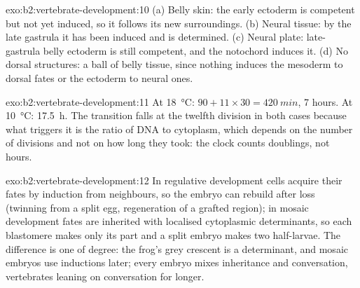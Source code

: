 \begin{solution}{exo:b2:vertebrate-development:10}
(a) Belly skin: the early ectoderm is competent but not yet induced,
so it follows its new surroundings. (b) Neural tissue: by the late
gastrula it has been induced and is determined. (c) Neural plate:
late-gastrula belly ectoderm is still competent, and the notochord
induces it. (d) No dorsal structures: a ball of belly tissue, since
nothing induces the mesoderm to dorsal fates or the ectoderm to
neural ones.
\end{solution}

\begin{solution}{exo:b2:vertebrate-development:11}
At \qty{18}{\celsius}: $90 + 11\times 30 = \qty{420}{min}$, 7 hours.
At \qty{10}{\celsius}: \qty{17.5}{h}. The transition falls at the
twelfth division in both cases because what triggers it is the
ratio of DNA to cytoplasm, which depends on the number of divisions
and not on how long they took: the clock counts doublings, not
hours.
\end{solution}

\begin{solution}{exo:b2:vertebrate-development:12}
In regulative development cells acquire their fates by induction
from neighbours, so the embryo can rebuild after loss (twinning from
a split egg, regeneration of a grafted region); in mosaic
development fates are inherited with localised cytoplasmic
determinants, so each blastomere makes only its part and a split
embryo makes two half-larvae. The difference is one of degree: the
frog's grey crescent is a determinant, and mosaic embryos use
inductions later; every embryo mixes inheritance and conversation,
vertebrates leaning on conversation for longer.
\end{solution}

